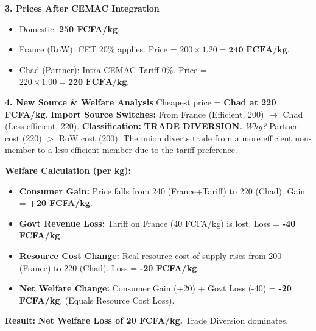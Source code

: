 \documentclass[11pt]{article}
\begin{document}
\begin{exoresolu}
\textbf{3. Prices After CEMAC Integration}
\begin{itemize}
    \item Domestic: \textbf{250 FCFA/kg}.
    \item France (RoW): CET 20\% applies. Price = $200 \times 1.20 = \mathbf{240 \text{ FCFA/kg}}$.
    \item Chad (Partner): Intra-CEMAC Tariff 0\%. Price = $220 \times 1.00 = \mathbf{220 \text{ FCFA/kg}}$.
\end{itemize}

\textbf{4. New Source \& Welfare Analysis}
Cheapest price = \textbf{Chad at 220 FCFA/kg}.
\textbf{Import Source Switches:} From France (Efficient, 200) $\rightarrow$ Chad (Less efficient, 220).
\textbf{Classification:} \textbf{TRADE DIVERSION.}
\textit{Why?} Partner cost (220) $>$ RoW cost (200). The union diverts trade from a more efficient non-member to a less efficient member due to the tariff preference.

\textbf{Welfare Calculation (per kg):}
\begin{itemize}
    \item \textbf{Consumer Gain:} Price falls from 240 (France+Tariff) to 220 (Chad). Gain = \textbf{+20 FCFA/kg}.
    \item \textbf{Govt Revenue Loss:} Tariff on France (40 FCFA/kg) is lost. Loss = \textbf{-40 FCFA/kg}.
    \item \textbf{Resource Cost Change:} Real resource cost of supply rises from 200 (France) to 220 (Chad). Loss = \textbf{-20 FCFA/kg}.
    \item \textbf{Net Welfare Change:} Consumer Gain (+20) + Govt Loss (-40) = \textbf{-20 FCFA/kg}. (Equals Resource Cost Loss).
\end{itemize}
\textbf{Result:} \textbf{Net Welfare Loss of 20 FCFA/kg.} Trade Diversion dominates.


\end{exoresolu}
\end{document}
